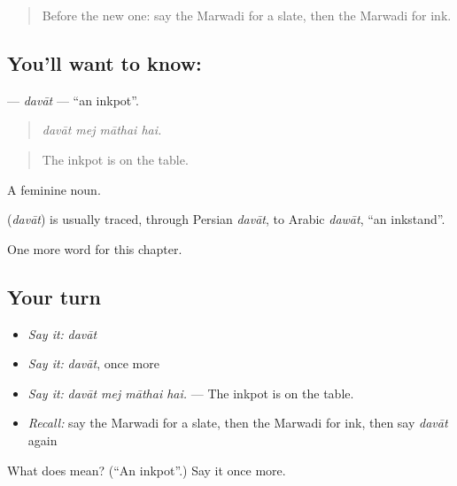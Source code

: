 \label{lesson:MW-C284-davat}



\begin{quote}
Before the new one: say the Marwadi for a slate, then the Marwadi for ink.
\end{quote}

\subsection*{You'll want to know: }
\textbf{} — \emph{davāt} — \textquotedblleft{}an inkpot\textquotedblright{}.

\begin{quote}
   
\end{quote}

\begin{quote}
\emph{davāt mej māthai hai.}
\end{quote}

\begin{quote}
The inkpot is on the table.
\end{quote}

A feminine noun.

\begin{cousinweb}
\textbf{} (\emph{davāt}) is usually traced, through Persian \emph{davāt}, to Arabic \emph{dawāt}, \textquotedblleft{}an inkstand\textquotedblright{}.
\end{cousinweb}

\begin{grammarlens}[title={What you've built}]
One more word for this chapter.
\end{grammarlens}

\subsection*{Your turn}
\begin{itemize}
\raggedright
  \item \emph{Say it:} \emph{davāt}
  \item \emph{Say it:} \emph{davāt}, once more
  \item \emph{Say it:} \emph{davāt mej māthai hai.} — The inkpot is on the table.
  \item \emph{Recall:} say the Marwadi for a slate, then the Marwadi for ink, then say \emph{davāt} again
\end{itemize}

\begin{tcolorbox}[breakable,colback=teal!4,colframe=teal!35!black,title={Before you move on}]
What does  mean? (\textquotedblleft{}An inkpot\textquotedblright{}.) Say it once more.
\end{tcolorbox}
